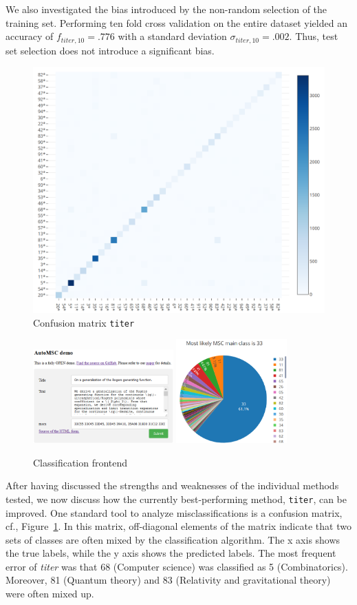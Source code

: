 We also investigated the bias introduced by the non-random selection of the training set.
Performing ten fold cross validation on the entire dataset yielded an accuracy of \(f_{titer,10} = .776\) with a standard deviation \(\sigma_{titer,10} = .002.\)
Thus, test set selection does not introduce a significant bias.


\begin{figure}[t]
  \centering
  \includegraphics[width=.7\textwidth]{confusion.png}
  \caption{Confusion matrix \texttt{titer}}\label{fgConfusion}
\end{figure}
\begin{figure}[t]
  \centering
  \includegraphics[width=0.48\textwidth]{webFrontend2.png}
  \includegraphics[width=0.38\textwidth]{webFrontend1.png}
  \caption{Classification frontend}\label{fgScreenshot}
 \end{figure}
After having discussed the strengths and weaknesses of the individual methods tested, we now discuss how the currently best-performing method, \texttt{titer}, can be improved.
One standard tool to analyze misclassifications is a confusion matrix, cf., Figure~\ref{fgConfusion}.
In this matrix, off-diagonal elements of the matrix indicate that two sets of classes are often mixed by the classification algorithm.
The x axis shows the true labels, while the y axis shows the predicted labels.
The most frequent error of \emph{titer} was that 68 (Computer science) was classified as 5 (Combinatorics).
Moreover, 81 (Quantum theory) and 83 (Relativity and gravitational theory) were often mixed up.


